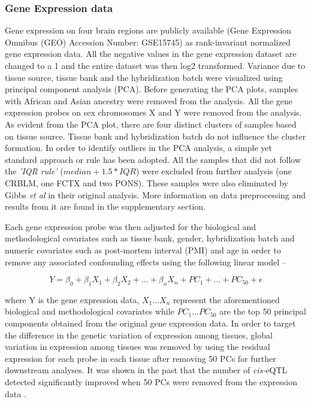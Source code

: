 \documentclass[hidelinks]{article}
\begin{document}
\subsubsection{Gene Expression data}
Gene expression on four brain regions are publicly available (Gene Expression Omnibus (GEO) Accession Number: GSE15745) as rank-invariant \cite{rankInvariant} normalized gene expression data. All the negative values in the gene expression dataset are changed to a 1 and the entire dataset was then log2 transformed. Variance due to tissue source, tissue bank and the hybridization batch were visualized using principal component analysis (PCA). Before generating the PCA plots, samples with African and Asian ancestry were removed from the analysis. All the gene expression probes on sex chromosomes X and Y were removed from the analysis. As evident from the PCA plot, there are four distinct clusters of samples based on tissue source. Tissue bank and hybridization batch do not influence the cluster formation. In order to identify outliers in the PCA analysis, a simple yet standard approach or rule has been adopted. All the samples that did not follow the \emph{'IQR rule'} ($median + 1.5 * IQR$) were excluded from further analysis (one CRBLM, one FCTX and two PONS). These samples were also eliminated by Gibbs \emph{et al} in their original analysis. More information on data preprocessing and results from it are found in the supplementary section. 

Each gene expression probe was then adjusted for the biological and methodological covariates such as tissue bank, gender, hybridization batch and numeric covariates such as post-mortem interval (PMI) and age in order to remove any associated confounding effects using the following linear model --

\begin{equation*}
Y = \beta_0 + \beta_1 X_1 + \beta_2 X_2 + \ldots + \beta_n X_n + PC_1 + \ldots + PC_{50} + \epsilon
\end{equation*}

where Y is the gene expression data, $X_1 \ldots X_n$ represent the aforementioned biological and methodological covariates while $PC_1 \ldots PC_{50}$ are the top 50 principal components obtained from the original gene expression data. In order to target the difference in the genetic variation of expression among tissues, global variation in expression among tissues was removed by using the residual expression for each probe in each tissue after removing 50 PCs for further downstream analyses. It was shown in the past that the number of \emph{cis-}eQTL detected significantly improved when 50 PCs were removed from the expression data \cite{Fu_Jing}.
\end{document}
